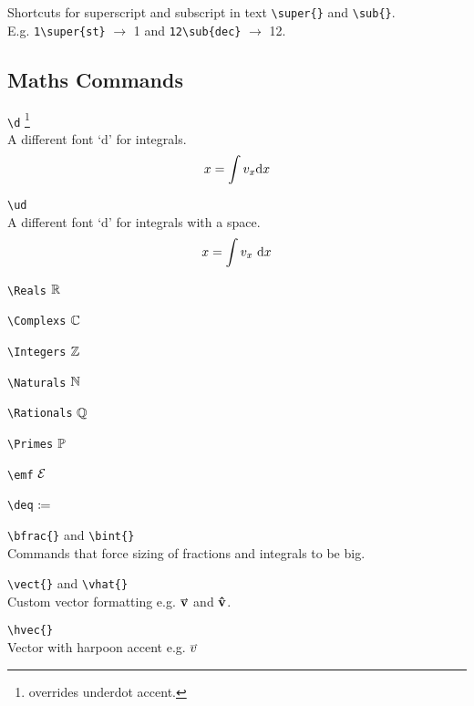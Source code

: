 \documentclass[Book Template.tex]{subfiles}
\begin{document}
                Shortcuts for superscript and subscript in text \verb+\super{}+ and \verb+\sub{}+.\\
                E.g. \verb+1\super{st}+ $\to$ 1 and \verb+12\sub{dec}+ $\to$ 12.


            \subsection{Maths Commands}
                \label{subsec: maths commands}

                \verb+\d+ \footnote{overrides underdot accent.}\\
                A different font `d' for integrals.
                \begin{equation*}
                    x = \int v_x \mathrm{d} x
                \end{equation*}

                \newpage

                \verb+\ud+\\
                A different font `d' for integrals with a space.
                \begin{equation*}
                    x = \int v_x \ \mathrm{d} x
                \end{equation*}

                \verb+\Reals+ $\mathbb{R}$
                
                \verb+\Complexs+ $\mathbb{C}$
                
                \verb+\Integers+ $\mathbb{Z}$
                
                \verb+\Naturals+ $\mathbb{N}$
                
                \verb+\Rationals+ $\mathbb{Q}$ 

                \verb+\Primes+ $\mathbb{P}$

                \verb+\emf+ $\mathcal{E}$

                \verb+\deq+ $\coloneqq$

                \verb+\bfrac{}+ and \verb+\bint{}+\\
                Commands that force sizing of fractions and integrals to be big.
                
                \verb+\vect{}+ and \verb+\vhat{}+\\
                Custom vector formatting e.g. $\vect{v}$ and $\boldsymbol{\mathbf{\hat{v}}}$.

                \verb+\hvec{}+\\
                Vector with harpoon accent e.g. $\hvec{v}$
\end{document}
